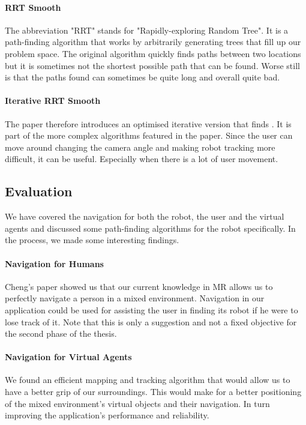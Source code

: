 \paragraph{RRT Smooth}
The abbreviation "RRT" stands for "Rapidly-exploring Random Tree". It is a path-finding algorithm that works by arbitrarily generating trees that fill up our problem space. The original algorithm quickly finds paths between two locations but it is sometimes not the shortest possible path that can be found. Worse still is that the paths found can sometimes be quite long and overall quite bad.\newline

\paragraph{Iterative RRT Smooth}
The paper\cite{abiyev2015improved} therefore introduces an optimised iterative version that finds . It is part of the more complex algorithms featured in the paper. Since the user can move around changing the camera angle and making robot tracking more difficult, it can be useful. Especially when there is a lot of user movement.

\subsection{Evaluation}
We have covered the navigation for both the robot, the user and the virtual agents and discussed some path-finding algorithms for the robot specifically. In the process, we made some interesting findings. 

\paragraph{Navigation for Humans}
Cheng's paper\cite{chen2009intuitive} showed us that our current knowledge in MR allows us to perfectly navigate a person in a mixed environment. Navigation in our application could be used for assisting the user in finding its robot if he were to lose track of it. Note that this is only a suggestion and not a fixed objective for the second phase of the thesis.

\paragraph{Navigation for Virtual Agents}
We found an efficient mapping and tracking algorithm \cite{newcombe2011kinectfusion}  that would allow us to have a better grip of our surroundings. This would make for a better positioning of the mixed environment's virtual objects and their navigation. In turn improving the application's performance and reliability.

